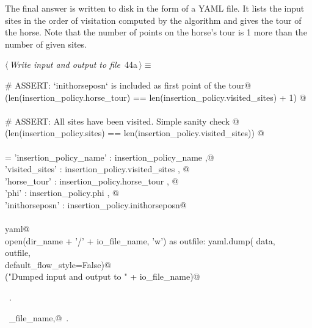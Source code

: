 \documentclass[11.5pt]{report}
\begin{document}
\vspace{-0.8cm}\newchunk The final answer is written to disk in the form of a YAML file. It lists the input sites 
in the order of visitation computed by the algorithm and gives the tour of the horse. 
Note that the number of points on the horse's tour is 1 more than the number of given sites. 
\begin{flushleft} \small\label{scrap60}\raggedright\small
{} $\langle\,${\itshape Write input and output to file}\nobreak\ {\footnotesize {44a}}$\,\rangle\equiv$
\vspace{-1ex}
\begin{list}{}{} \item
\mbox{}\verb@# ASSERT: `inithorseposn` is included as first point of the tour@\\
\mbox{}\verb@assert(len(insertion_policy.horse_tour) == len(insertion_policy.visited_sites) + 1) @\\
\mbox{}\verb@@\\
\mbox{}\verb@# ASSERT: All sites have been visited. Simple sanity check @\\
\mbox{}\verb@assert(len(insertion_policy.sites)   == len(insertion_policy.visited_sites)) @\\
\mbox{}\verb@@\\
\mbox{}\verb@data = {'insertion_policy_name' : insertion_policy_name   ,@\\
\mbox{}\verb@        'visited_sites'  : insertion_policy.visited_sites , @\\
\mbox{}\verb@        'horse_tour'     : insertion_policy.horse_tour    , @\\
\mbox{}\verb@        'phi'            : insertion_policy.phi           , @\\
\mbox{}\verb@        'inithorseposn'  : insertion_policy.inithorseposn}@\\
\mbox{}\verb@@\\
\mbox{}\verb@import yaml@\\
\mbox{}\verb@with open(dir_name + '/' + io_file_name, 'w') as outfile:     yaml.dump( data, \@\\
\mbox{}\verb@                outfile, \@\\
\mbox{}\verb@                default_flow_style=False)@\\
\mbox{}\verb@debug("Dumped input and output to " + io_file_name)@\\
\mbox{}\verb@@{\NWsep}
\end{list}
\vspace{-1.5ex}
\footnotesize
\begin{list}{}{\setlength{\itemsep}{-\parsep}\setlength{\itemindent}{-\leftmargin}}
\item \NWtxtMacroRefIn\ .
\item \NWtxtIdentsUsed\nobreak\  \verb@io_file_name,@\nobreak\ .
\item{}
\end{list}
\vspace{4ex}
\end{flushleft}
\end{document}

